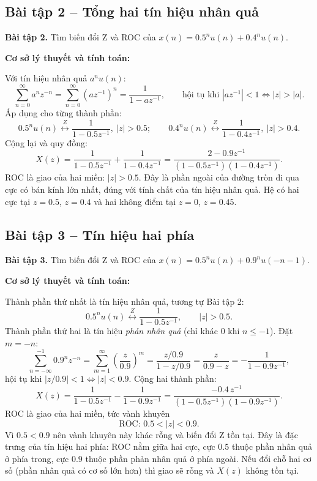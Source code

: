 \documentclass[12pt,a4paper]{article}
\begin{document}
\subsection{Bài tập 2 -- Tổng hai tín hiệu nhân quả}
\begin{mdframed}[style=exbox]
\noindent\textbf{Bài tập 2.} Tìm biến đổi Z và ROC của $x(n) = 0.5^{n} u(n) + 0.4^{n} u(n)$.
\end{mdframed}

\noindent\textbf{Cơ sở lý thuyết và tính toán:}

Với tín hiệu nhân quả $a^n u(n)$:
\[
    \sum_{n=0}^{\infty} a^n z^{-n} = \sum_{n=0}^{\infty} \left(a z^{-1}\right)^n = \frac{1}{1 - a z^{-1}}, \qquad \text{hội tụ khi } |a z^{-1}| < 1 \iff |z| > |a|.
\]
Áp dụng cho từng thành phần:
\[
    0.5^n u(n) \overset{Z}{\longleftrightarrow} \frac{1}{1 - 0.5 z^{-1}},\ |z| > 0.5;
    \qquad
    0.4^n u(n) \overset{Z}{\longleftrightarrow} \frac{1}{1 - 0.4 z^{-1}},\ |z| > 0.4.
\]
Cộng lại và quy đồng:
\begin{equation}
    X(z) = \frac{1}{1 - 0.5 z^{-1}} + \frac{1}{1 - 0.4 z^{-1}} = \frac{2 - 0.9 z^{-1}}{(1 - 0.5 z^{-1})(1 - 0.4 z^{-1})}.
\end{equation}
ROC là giao của hai miền: $|z| > 0.5$. Đây là phần ngoài của đường tròn đi qua cực có bán kính lớn nhất, đúng với tính chất của tín hiệu nhân quả. Hệ có hai cực tại $z = 0.5$, $z = 0.4$ và hai không điểm tại $z = 0$, $z = 0.45$.

\subsection{Bài tập 3 -- Tín hiệu hai phía}
\begin{mdframed}[style=exbox]
\noindent\textbf{Bài tập 3.} Tìm biến đổi Z và ROC của $x(n) = 0.5^{n} u(n) + 0.9^{n} u(-n-1)$.
\end{mdframed}

\noindent\textbf{Cơ sở lý thuyết và tính toán:}

Thành phần thứ nhất là tín hiệu nhân quả, tương tự Bài tập 2:
\[
    0.5^n u(n) \overset{Z}{\longleftrightarrow} \frac{1}{1 - 0.5 z^{-1}}, \qquad |z| > 0.5.
\]
Thành phần thứ hai là tín hiệu \emph{phản nhân quả} (chỉ khác 0 khi $n \le -1$). Đặt $m = -n$:
\[
    \sum_{n=-\infty}^{-1} 0.9^n z^{-n} = \sum_{m=1}^{\infty} \left(\frac{z}{0.9}\right)^m = \frac{z/0.9}{1 - z/0.9} = \frac{z}{0.9 - z} = -\frac{1}{1 - 0.9 z^{-1}},
\]
hội tụ khi $|z/0.9| < 1 \iff |z| < 0.9$. Cộng hai thành phần:
\begin{equation}
    X(z) = \frac{1}{1 - 0.5 z^{-1}} - \frac{1}{1 - 0.9 z^{-1}} = \frac{-0.4\, z^{-1}}{(1 - 0.5 z^{-1})(1 - 0.9 z^{-1})}.
\end{equation}
ROC là giao của hai miền, tức vành khuyên
\[
    \text{ROC: } 0.5 < |z| < 0.9.
\]
Vì $0.5 < 0.9$ nên vành khuyên này khác rỗng và biến đổi Z tồn tại. Đây là đặc trưng của tín hiệu hai phía: ROC nằm giữa hai cực, cực $0.5$ thuộc phần nhân quả ở phía trong, cực $0.9$ thuộc phần phản nhân quả ở phía ngoài. Nếu đổi chỗ hai cơ số (phần nhân quả có cơ số lớn hơn) thì giao sẽ rỗng và $X(z)$ không tồn tại.
\end{document}
